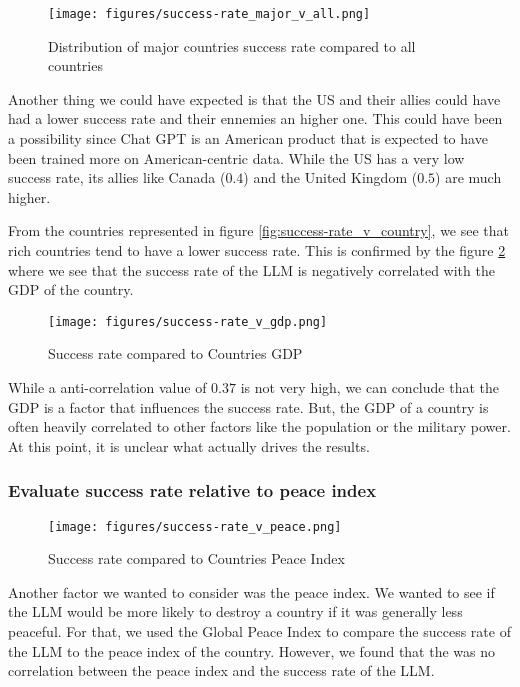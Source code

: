 \begin{figure}[H]
    \texttt{[image: figures/success-rate\_major\_v\_all.png]}
    \caption[Plot of the success rate distribution of major countries compared to the distribution of all countries]{Distribution of major countries success rate compared to all countries}
    \label{fig:success-rate_major_v_all}
\end{figure}

Another thing we could have expected is that the US and their allies could have had a lower success rate and their ennemies an higher one. This could have been a possibility since Chat GPT is an American product that is expected to have been trained more on American-centric data. While the US has a very low success rate, its allies like Canada ($0.4$) and the United Kingdom ($0.5$) are much higher.

From the countries represented in figure \ref{fig:success-rate_v_country}, we see that rich countries tend to have a lower success rate. This is confirmed by the figure \ref{fig:success-rate_v_gdp} where we see that the success rate of the LLM is negatively correlated with the GDP of the country.

\begin{figure}[H]
    \texttt{[image: figures/success-rate\_v\_gdp.png]}
    \caption[Plot of success rate of countries based on their GDP]{Success rate compared to Countries GDP \cite{worldbank:gdp}}
    \label{fig:success-rate_v_gdp}
\end{figure}

While a anti-correlation value of $0.37$ is not very high, we can conclude that the GDP is a factor that influences the success rate. But, the GDP of a country is often heavily correlated to other factors like the population or the military power. At this point, it is unclear what actually drives the results.

\subsubsection{Evaluate success rate relative to peace index}

\begin{figure}[H]
    \texttt{[image: figures/success-rate\_v\_peace.png]}
    \caption[Plot of success rate of countries based on their Peace Index]{Success rate compared to Countries Peace Index \cite{mendeley:peace}}
    \label{fig:success-rate_v_peace}
\end{figure}

Another factor we wanted to consider was the peace index. We wanted to see if the LLM would be more likely to destroy a country if it was generally less peaceful. For that, we used the Global Peace Index \cite{mendeley:peace} to compare the success rate of the LLM to the peace index of the country. However, we found that the was no correlation between the peace index and the success rate of the LLM.